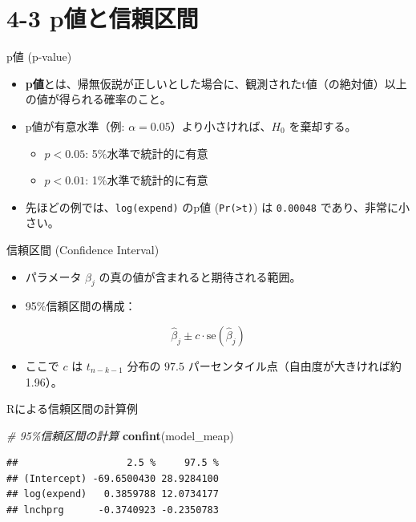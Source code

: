 \documentclass[
  ignorenonframetext,
]{beamer}
\newenvironment{Shaded}{\begin{snugshade}}{\end{snugshade}}
\newcommand{\CommentTok}[1]{\textcolor[rgb]{0.56,0.35,0.01}{\textit{#1}}}
\newcommand{\FunctionTok}[1]{\textcolor[rgb]{0.13,0.29,0.53}{\textbf{#1}}}
\newcommand{\NormalTok}[1]{#1}
\providecommand{\tightlist}{%
  \setlength{\itemsep}{0pt}\setlength{\parskip}{0pt}}
\begin{document}
\section{4-3 p値と信頼区間}\label{pux5024ux3068ux4fe1ux983cux533aux9593}

\begin{frame}[fragile]{p値 (p-value)}
\label{pux5024-p-value}
\begin{itemize}
\tightlist
\item
  \textbf{p値}とは、帰無仮説が正しいとした場合に、観測されたt値（の絶対値）以上の値が得られる確率のこと。
\item
  p値が有意水準（例: \(\alpha = 0.05\)）より小さければ、\(H_0\)
  を棄却する。

  \begin{itemize}
  \tightlist
  \item
    \(p < 0.05\): 5\%水準で統計的に有意
  \item
    \(p < 0.01\): 1\%水準で統計的に有意
  \end{itemize}
\item
  先ほどの例では、\texttt{log(expend)} のp値
  (\texttt{Pr(\textgreater{}\textbar{}t\textbar{})}) は \texttt{0.00048}
  であり、非常に小さい。
\end{itemize}
\end{frame}

\begin{frame}{信頼区間 (Confidence Interval)}
\label{ux4fe1ux983cux533aux9593-confidence-interval}
\begin{itemize}
\tightlist
\item
  パラメータ \(\beta_j\) の真の値が含まれると期待される範囲。
\item
  95\%信頼区間の構成：
\end{itemize}

\[ \hat{\beta}_j \pm c \cdot \text{se}(\hat{\beta}_j) \]

\begin{itemize}
\tightlist
\item
  ここで \(c\) は \(t_{n-k-1}\) 分布の \(97.5\)
  パーセンタイル点（自由度が大きければ約1.96）。
\end{itemize}
\end{frame}

\begin{frame}[fragile]{Rによる信頼区間の計算例}
\label{rux306bux3088ux308bux4fe1ux983cux533aux9593ux306eux8a08ux7b97ux4f8b}
\begin{Shaded}
\begin{Highlighting}[]
\CommentTok{\# 95\%信頼区間の計算}
\FunctionTok{confint}\NormalTok{(model\_meap)}
\end{Highlighting}
\end{Shaded}

\begin{verbatim}
##                   2.5 %     97.5 %
## (Intercept) -69.6500430 28.9284100
## log(expend)   0.3859788 12.0734177
## lnchprg      -0.3740923 -0.2350783
\end{verbatim}
\end{frame}
\end{document}
